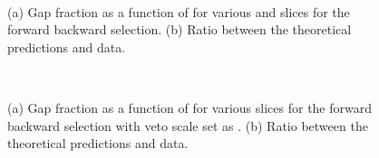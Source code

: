 \begin{figure}
\centering
\mbox{
              \quad
              \quad
}
\caption[Gap fraction as a function of \qz{} for forward backward selection]{ 
(a) Gap fraction as a function of \qz{} for various \dy{} and \ptb{} slices for the forward backward selection. 
(b) Ratio between the theoretical predictions and data. 
\label{GBJ1:Q0SelB}}
\end{figure}


\begin{figure}
\centering
\mbox{
              \quad
              \quad
}
\caption[Gap fraction as a function of \dy{} for forward backward selection and variable \qz{}]{ 
(a) Gap fraction as a function of \dy{} for various \ptb{} slices for the forward backward selection with veto scale set as \ptb{}. 
(b) Ratio between the theoretical predictions and data. 
\label{GBJ1:pTSelBQ0}}
\end{figure}

